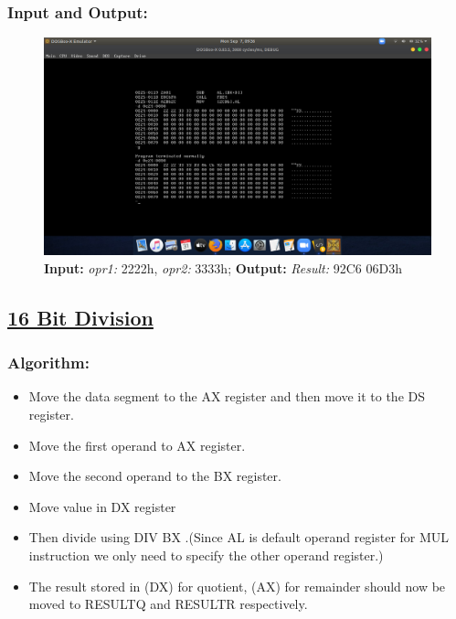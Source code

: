 \documentclass[12pt,a4paper]{article}
\begin{document}
\begin{flushleft}
\subsubsection*{\textbf{Input and Output:}}
\begin{figure}[h]
    \centering
    \includegraphics[trim = 100mm 60mm 100mm 80mm, clip, width = \textwidth]{MultiplicationIO.png}
    \caption{ \textbf{Input:} \emph{opr1:} 2222h, \emph{opr2:} 3333h; 
              \textbf{Output:} \emph{Result:} 92C6 06D3h}
\end{figure}
\newpage
\subsection*{\textbf{\underline{16 Bit Division}}}

\subsubsection*{\textbf{Algorithm:}}
\begin{itemize}
    \item Move the data segment to the AX register and then move it to the DS register.
    \item Move the first operand to AX register.
    \item  Move the second operand to the BX register.
    \item Move value in DX register
    \item  Then divide using DIV BX .(Since AL is default operand register for MUL instruction we only need to specify the other operand register.)
    \item  The result stored in (DX) for quotient, (AX) for remainder should now be moved to RESULTQ and RESULTR respectively.
\end{itemize}


\end{flushleft}
\end{document}
